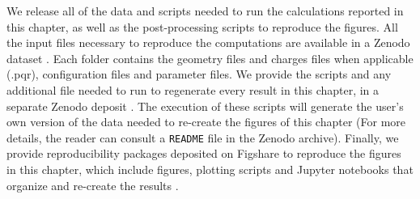 We release all of the data and scripts needed to run the calculations reported in this chapter, 
as well as the post-processing scripts to reproduce the figures. 
All the input files necessary to reproduce the computations are available in a Zenodo dataset \cite{ClementiETal2018a}. 
Each folder contains the geometry files and charges files when applicable (.pqr), configuration files and parameter files.
We provide the scripts and any additional file needed to run \pygbe to regenerate every result in this chapter, in a 
separate Zenodo deposit \cite{ClementiETal2018b}. The execution of these scripts will generate the user's own version of the data 
needed to re-create the figures of this chapter (For more details, the reader can consult a \texttt{README} file in the Zenodo archive).
Finally, we provide reproducibility packages deposited on Figshare to reproduce the figures in this chapter, which include 
figures, plotting scripts and Jupyter notebooks that organize and re-create the results 
\cite{ClementiETal2018c,ClementiETal2018d,ClementiETal2018e,ClementiETal2018f}.
